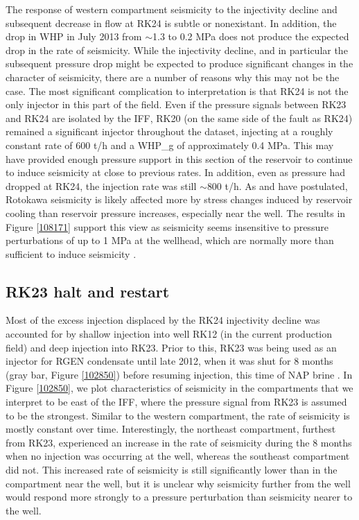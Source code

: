 The response of western compartment seismicity to the \gls{injectivity} decline and subsequent decrease in flow at RK24 is subtle or nonexistant. In addition, the drop in \acrshort{WHP} in July 2013 from $\sim${1.3} to 0.2 MPa does not produce the expected drop in the rate of seismicity. While the \gls{injectivity} decline, and in particular the subsequent pressure drop might be expected to produce significant changes in the character of seismicity, there are a number of reasons why this may not be the case. The most significant complication to interpretation is that RK24 is not the only injector in this part of the field. Even if the pressure signals between RK23 and RK24 are isolated by the \acrshort{IFF}, RK20 (on the same side of the fault as RK24) remained a significant injector throughout the dataset, injecting at a roughly constant rate of 600 t/h and a \gls{WHP_g} of approximately 0.4 MPa. This may have provided enough pressure support in this section of the reservoir to continue to induce seismicity at close to previous rates. In addition, even as pressure had dropped at RK24, the injection rate was still $\sim$800 t/h. As \citet{Sherburn_2015} and \citet{Sewell_2015WGC} have postulated, Rotokawa seismicity is likely affected more by stress changes induced by reservoir cooling than reservoir pressure increases, especially near the well. The results in Figure \ref{108171} support this view as seismicity seems insensitive to pressure perturbations of up to 1 MPa at the wellhead, which are normally more than sufficient to induce seismicity \citep{keranen2018induced,stein1999role}.

\subsection{RK23 halt and restart}
Most of the excess injection displaced by the RK24 \gls{injectivity} decline was accounted for by shallow injection into well RK12 (in the current production field) and deep injection into RK23. Prior to this, RK23 was being used as an injector for \acrshort{RGEN} condensate until late 2012, when it was shut for 8 months (gray bar, Figure \ref{102850}) before resuming injection, this time of \acrshort{NAP} brine \citep{Addison_2017stanford}. In Figure \ref{102850}, we plot characteristics of seismicity in the compartments that we interpret to be east of the \acrshort{IFF}, where the pressure signal from RK23 is assumed to be the strongest. Similar to the western compartment, the rate of seismicity is mostly constant over time. Interestingly, the northeast compartment, furthest from RK23, experienced an increase in the rate of seismicity during the 8 months when no injection was occurring at the well, whereas the southeast compartment did not. This increased rate of seismicity is still significantly lower than in the compartment near the well, but it is unclear why seismicity further from the well would respond more strongly to a pressure perturbation than seismicity nearer to the well.

